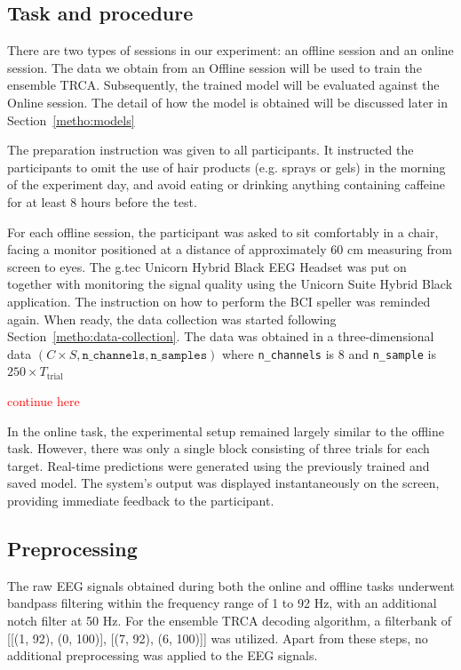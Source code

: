 \subsection{Task and procedure}

There are two types of sessions in our experiment: an offline session and an online session.
The data we obtain from an Offline session will be used to train the ensemble TRCA.
Subsequently, the trained model will be evaluated against the Online session.
The detail of how the model is obtained will be discussed later in Section~\ref{metho:models}

The preparation instruction was given to all participants.
It instructed the participants to omit the use of hair products (e.g. sprays or gels) in the morning of the experiment day, and avoid eating or drinking anything containing caffeine for at least 8 hours before the test.

For each offline session, the participant was asked to sit comfortably in a chair, facing a monitor positioned at a distance of approximately 60 cm measuring from screen to eyes.
The g.tec Unicorn Hybrid Black EEG Headset was put on together with monitoring the signal quality using the Unicorn Suite Hybrid Black application.
The instruction on how to perform the BCI speller was reminded again.
When ready, the data collection was started following Section~\ref{metho:data-collection}.
The data was obtained in a three-dimensional data \( ( C \times S, \texttt{n\_channels}, \texttt{n\_samples}) \) where  \texttt{n\_channels} is 8 and \texttt{n\_sample} is \(250 \times T_\text{trial} \)

\textcolor{red}{continue here}

In the online task, the experimental setup remained largely similar to the offline task. 
However, there was only a single block consisting of three trials for each target. 
Real-time predictions were generated using the previously trained and saved model. 
The system's output was displayed instantaneously on the screen, providing immediate feedback to the participant. 

\subsection{Preprocessing}
The raw EEG signals obtained during both the online and offline tasks underwent bandpass filtering within the frequency range of 1 to 92 Hz, with an additional notch filter at 50 Hz. For the ensemble TRCA decoding algorithm, a filterbank of [[(1, 92), (0, 100)], [(7, 92), (6, 100)]] was utilized. Apart from these steps, no additional preprocessing was applied to the EEG signals.

